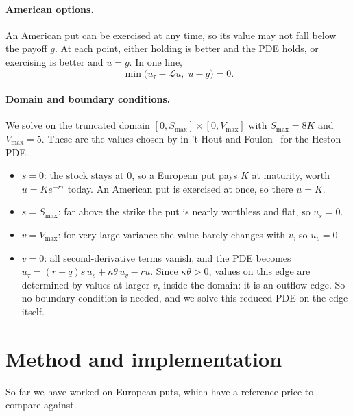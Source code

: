 \documentclass[11pt]{article}
\newcommand{\Smax}{S_{\max}}
\newcommand{\Vmax}{V_{\max}}
\newcommand{\Lop}{\mathcal{L}}
\begin{document}
\paragraph{American options.}
An American put can be exercised at any time, so its value may not fall below the payoff $g$. At each point,
either holding is better and the PDE holds, or exercising is better and $u=g$. In one line,
\begin{equation}\label{eq:lcp}
  \min\bigl(u_\tau - \Lop u,\; u - g\bigr) = 0.
\end{equation}

\paragraph{Domain and boundary conditions.}
We solve on the truncated domain $[0,\Smax]\times[0,\Vmax]$ with $\Smax=8K$ and $\Vmax=5$.
These are the values chosen by in 't Hout and Foulon~\cite{inthout2010} for the Heston PDE.
\begin{itemize}
  \item $s=0$: the stock stays at $0$, so a European put pays $K$ at maturity, worth $u=Ke^{-r\tau}$ today.
  An American put is exercised at once, so there $u=K$.
  \item $s=\Smax$: far above the strike the put is nearly worthless and flat, so $u_s=0$.
  \item $v=\Vmax$: for very large variance the value barely changes with $v$, so $u_v=0$.
  \item $v=0$: all second-derivative terms vanish, and the PDE becomes
  $u_\tau=(r-q)s\,u_s+\kappa\theta\,u_v-ru$. Since $\kappa\theta>0$, values on this edge are determined by
  values at larger $v$, inside the domain: it is an outflow edge. So no boundary condition is needed, and we
  solve this reduced PDE on the edge itself.
\end{itemize}

\section{Method and implementation}
So far we have worked on European puts, which have a reference price to compare against.
\end{document}
